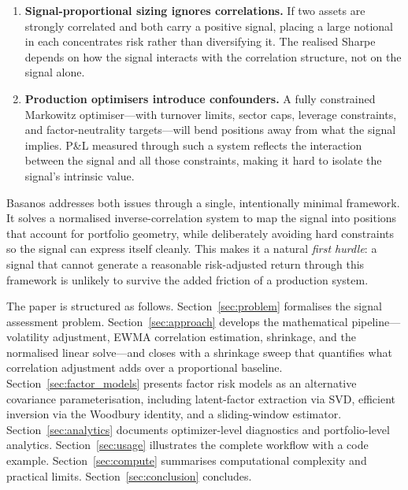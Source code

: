 \documentclass[11pt,a4paper]{article}
\begin{document}
\begin{enumerate}
  \item \textbf{Signal-proportional sizing ignores correlations.} If two
    assets are strongly correlated and both carry a positive signal, placing a
    large notional in each concentrates risk rather than diversifying it.  The
    realised Sharpe depends on how the signal interacts with the correlation
    structure, not on the signal alone.

  \item \textbf{Production optimisers introduce confounders.} A fully
    constrained Markowitz optimiser---with turnover limits, sector caps,
    leverage constraints, and factor-neutrality targets---will bend positions
    away from what the signal implies.  P\&L measured through such a system
    reflects the interaction between the signal and all those constraints,
    making it hard to isolate the signal's intrinsic value.
\end{enumerate}

Basanos addresses both issues through a single, intentionally minimal
framework.  It solves a normalised inverse-correlation system to map the signal
into positions that account for portfolio geometry, while deliberately avoiding
hard constraints so the signal can express itself cleanly.  This makes it a
natural \emph{first hurdle}: a signal that cannot generate a reasonable
risk-adjusted return through this framework is unlikely to survive the added
friction of a production system.

The paper is structured as follows.  Section~\ref{sec:problem} formalises the
signal assessment problem.  Section~\ref{sec:approach} develops the
mathematical pipeline---volatility adjustment, EWMA correlation estimation,
shrinkage, and the normalised linear solve---and closes with a shrinkage sweep
that quantifies what correlation adjustment adds over a proportional baseline.
Section~\ref{sec:factor_models} presents factor risk models as an alternative
covariance parameterisation, including latent-factor extraction via SVD,
efficient inversion via the Woodbury identity, and a sliding-window estimator.
Section~\ref{sec:analytics} documents optimizer-level diagnostics and
portfolio-level analytics.  Section~\ref{sec:usage} illustrates the complete
workflow with a code example.  Section~\ref{sec:compute} summarises
computational complexity and practical limits.
Section~\ref{sec:conclusion} concludes.

\end{document}

